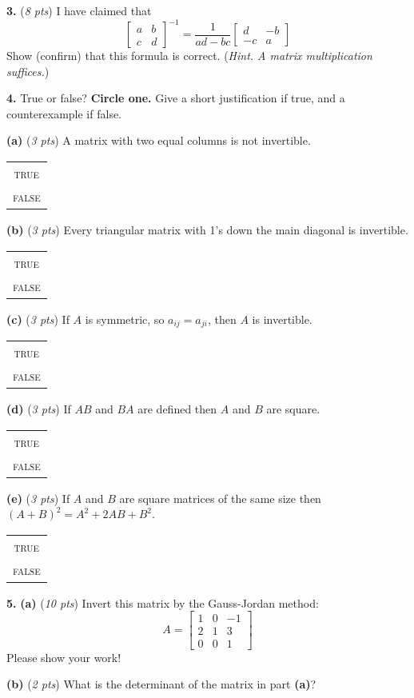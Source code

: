 \documentclass[11pt]{amsart}
\newcommand{\prob}[1]{\bigskip\noindent\textbf{#1.} }
\newcommand{\pts}[1]{(\emph{#1 pts})}
\newcommand{\probpts}[2]{\prob{#1} \pts{#2} \quad}
\newcommand{\ppartpts}[2]{\textbf{(#1)} \pts{#2} \quad}
\newcommand{\epartpts}[2]{\medskip\noindent \textbf{(#1)} \pts{#2} \quad}
\begin{document}
\probpts{3}{8}  I have claimed that
    $$\begin{bmatrix} a & b \\ c & d \end{bmatrix}^{-1} = \frac{1}{ad - bc} \begin{bmatrix} d & -b \\ -c & a \end{bmatrix}$$
Show (confirm) that this formula is correct.  (\emph{Hint.  A matrix multiplication suffices.})
\vfill

\newcommand{\tf}{\medskip\noindent\begin{tabular}{c} \textsc{true} \\ \textsc{false} \end{tabular}}
\clearpage
\newpage
\prob{4}  True or false?  \textbf{Circle one.}  Give a short justification if true, and a counterexample if false.

\epartpts{a}{3}  A matrix with two equal columns is not invertible.

\tf
\vfill

\epartpts{b}{3}  Every triangular matrix with 1's down the main diagonal is invertible.

\tf
\vfill

\epartpts{c}{3}  If $A$ is symmetric, so $a_{ij} = a_{ji}$, then $A$ is invertible.

\tf
\vfill

\epartpts{d}{3}  If $AB$ and $BA$ are defined then $A$ and $B$ are square.

\tf
\vfill

\epartpts{e}{3}  If $A$ and $B$ are square matrices of the same size then $(A+B)^2 = A^2 + 2AB + B^2$.

\tf
\vfill

\clearpage
\newpage
\prob{5} \ppartpts{a}{10}  Invert this matrix by the Gauss-Jordan method:
    $$A = \begin{bmatrix} 1 & 0 & -1 \\ 2 & 1 & 3 \\ 0 & 0 & 1 \end{bmatrix}$$
Please show your work!
\vfill
\begin{comment}
inv(A) =  1         0         1
         -2         1        -5
          0         0         1
\end{comment}

\epartpts{b}{2}  What is the determinant of the matrix in part \textbf{(a)}?
\vspace{1.0in}
\end{document}
